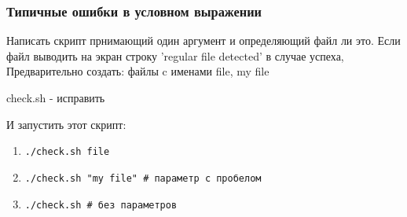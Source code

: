\begin{frame}[fragile]
\frametitle{Типичные ошибки в условном выражении}

	Написать скрипт прнимающий один аргумент и определяющий файл ли это. Если файл выводить на экран строку 'regular file detected' в случае успеха,
Предварительно создать: файлы c именами file, my file
	\begin{block}{check.sh - исправить}
      
    \end{block}
    \normalsize
	И запустить этот скрипт:
	
	\begin{enumerate}
            \item {\tt ./check.sh file} 
            \item {\tt ./check.sh "my file" \# параметр с пробелом}
            \item {\tt ./check.sh \# без параметров}
        \end{enumerate}

\end{frame}
